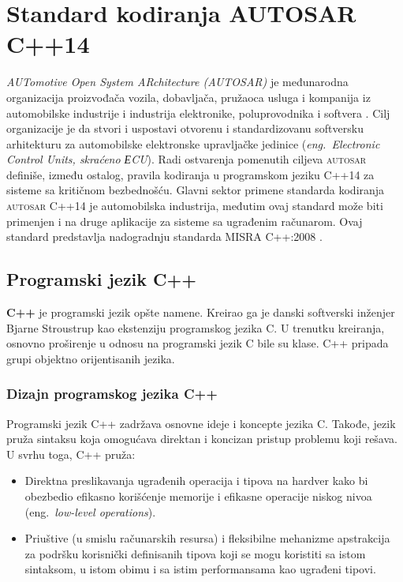 \documentclass[12pt,oneside]{memoir}
\begin{document}
\chapter{Standard kodiranja \textsc{AUTOSAR} C++14}
\label{chp:autosar}

\textit{AUTomotive Open System ARchitecture (\textsc{AUTOSAR})} je međunarodna organizacija proizvođača vozila, dobavljača, pružaoca usluga i kompanija iz automobilske industrije i industrija elektronike, poluprovodnika i softvera \cite{autosarWebsite}. 
Cilj organizacije je da stvori i uspostavi otvorenu i standardizovanu softversku arhitekturu za automobilske elektronske upravljačke jedinice (\textit{eng.~Electronic Control Units, skra\'{c}eno ЕCU}).
Radi ostvarenja pomenutih ciljeva \textsc{autosar} definiše, između ostalog, pravila kodiranja u programskom jeziku C++14 za sisteme sa kriti\v{c}nom bezbedno\v{s}\'{c}u. Glavni sektor primene standarda kodiranja \textsc{autosar} C++14 je automobilska industrija, međutim ovaj standard može biti primenjen
i na druge aplikacije za sisteme sa ugrađenim računarom. Ovaj standard predstavlja nadogradnju standarda MISRA C++:2008 \cite{AutosarGuidelines}.

\section{Programski jezik C++}

\textbf{C++} je programski jezik op\v{s}te namene. Kreirao ga je danski softverski in\v{z}enjer Bjarne Stroustrup kao ekstenziju programskog jezika C. U trenutku kreiranja, osnovno pro\v{s}irenje u odnosu na programski jezik C bile su klase. C++ pripada grupi objektno orijentisanih jezika. 

\subsection{Dizajn programskog jezika C++}

Programski jezik C++ zadr\v{z}ava osnovne ideje i koncepte jezika C. Takođe, jezik pru\v{z}a sintaksu koja omogu\'{c}ava direktan i koncizan pristup problemu koji re\v{s}ava.
U svrhu toga, C++ pru\v{z}a:
\begin{itemize}
  \item {Direktna preslikavanja ugrađenih operacija i tipova na hardver kako bi obezbedio efikasno kori\v{s}\'{c}enje memorije i efikasne operacije niskog nivoa (eng.~\textit{low-level operations}).}
  \item {Priu\v{s}tive (u smislu ra\v{c}unarskih resursa) i fleksibilne mehanizme apstrakcija za podr\v{s}ku korisni\v{c}ki definisanih tipova koji se mogu koristiti sa istom sintaksom, u istom obimu i sa istim performansama kao ugrađeni tipovi.}
\end{itemize}
\end{document}
